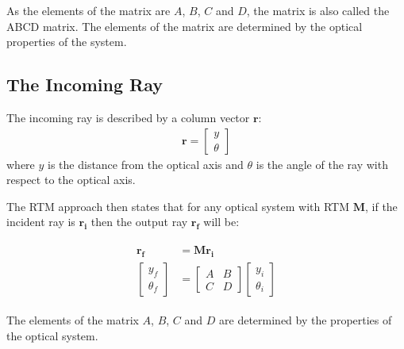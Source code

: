 \documentclass[12pt]{article}
\begin{document}
As the elements of the matrix are \(A\), \(B\), \(C\) and \(D\), the matrix is also called the ABCD matrix. The elements of the matrix are determined by the optical properties of the system.

\subsection{The Incoming Ray}
The incoming ray is described by a column vector \(\mathbf{r}\):
\begin{align}
    \label{eq:incoming}
    \mathbf{r} = \begin{bmatrix}
                     y \\
                     \theta
                 \end{bmatrix}
\end{align}
where \(y\) is the distance from the optical axis and \(\theta\) is the angle of the ray with respect to the optical axis.

The RTM approach then states that for any optical system with RTM \(\mathbf{M}\), if the incident ray is \(\mathbf{r_i}\) then the output ray \(\mathbf{r_f}\) will be:

\begin{align}
    \label{eq:rtm-transformation}
    \begin{split}
        \mathbf{r_f}    & =\mathbf{M}\mathbf{r_i}      \\
        \begin{bmatrix}
            y_f \\
            \theta_f
        \end{bmatrix} & = \begin{bmatrix}
            A & B \\
            C & D
        \end{bmatrix} \begin{bmatrix}
            y_i \\
            \theta_i
        \end{bmatrix}\end{split}
\end{align}

The elements of the matrix \(A\), \(B\), \(C\) and \(D\) are determined by the properties of the optical system.
\end{document}

